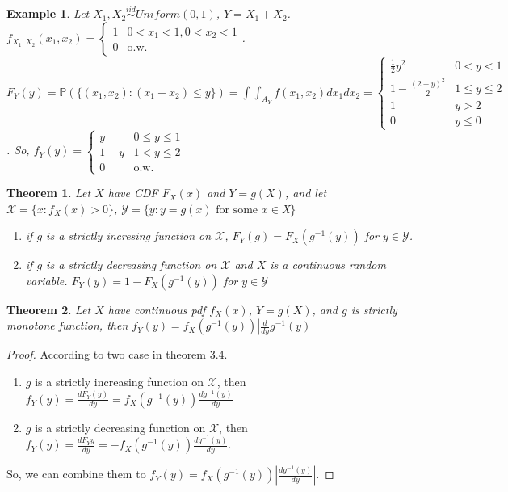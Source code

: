 \documentclass[11pt]{article}
\def\BP{{\bf P}}
\def\BP{{\mathbb P}}
\newtheorem{theorem}{Theorem}[section]
\newtheorem{example}{Example}[section]
\begin{document}
\begin{example}
  Let $X_1, X_2 \stackrel{iid}{\sim} Uniform(0, 1)$, $Y = X_1 + X_2$. $f_{X_1, X_2}(x_1, x_2) = \begin{cases} 1 & 0<x_1 < 1, 0 < x_2 < 1 \\ 0 & \text{o.w.} \end{cases}$. $F_Y(y) = \BP(\{(x_1, x_2): (x_1 + x_2) \leq y \}) = \int\int_{A_Y} f(x_1, x_2) dx_1dx_2 = \begin{cases}\frac{1}{2}y^2 & 0<y<1 \\
  1 - \frac{(2-y)^2}{2} & 1 \leq y \leq 2 \\ 1 & y > 2 \\ 0 & y \leq 0 \end{cases}$. So,
  $f_Y(y) = \begin{cases}y & 0\leq y \leq 1 \\ 1 - y & 1 < y \leq 2 \\ 0 & \text{o.w.} \end{cases}$
\end{example}

\begin{theorem}
Let $X$ have CDF $F_X(x)$ and $Y=g(X)$, and let $\mathcal{X} = \{x : f_X(x) > 0\}$, $\mathcal{Y} = \{y: y = g(x) \text{ for some }x \in $X$\}$
\begin{enumerate}
\item if $g$ is a strictly incresing function on $\mathcal{X}$, $F_Y(g) = F_X(g^{-1}(y))$ for $y \in \mathcal{Y}$.
\item if $g$ is a strictly decreasing function on $\mathcal{X}$ and $X$ is a continuous  random variable. $F_Y(y) = 1 - F_X(g^{-1}(y))$ for $y\in\mathcal{Y}$
\end{enumerate}
\end{theorem}

\begin{theorem}
Let $X$ have continuous pdf $f_X(x)$, $Y=g(X)$, and $g$ is strictly monotone function, then $f_Y(y) = f_X(g^{-1}(y)) |\frac{d}{dy}g^{-1}(y)| $ 
\end{theorem}

\begin{proof}
According to two case in theorem 3.4. 
\begin{enumerate}
\item $g$ is a strictly increasing function on $\mathcal{X}$, then 
$f_Y(y) = \frac{dF_Y(y)}{dy} = f_X(g^{-1}(y)) \frac{dg^{-1}(y)}{dy}$
\item $g$ is a strictly decreasing function on $\mathcal{X}$, then 
$f_Y(y) = \frac{dF_Y{y}}{dy} =-f_X(g^{-1}(y))\frac{dg^{-1}(y)}{dy}$.
\end{enumerate}
So, we can combine them to $f_Y(y) = f_X(g^{-1}(y)) |\frac{dg^{-1}(y)}{dy}|$.
\end{proof}
\end{document}
